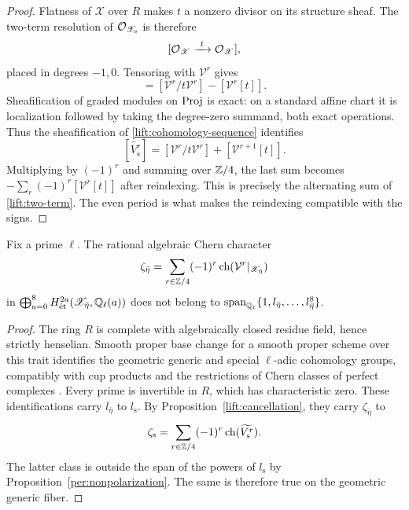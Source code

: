 \begin{proof}
Flatness of $\mathscr X$ over $R$ makes $t$ a nonzero divisor on its
structure sheaf.  The two-term resolution of
$\mathcal O_{\mathscr X_{\mathrm s}}$ is therefore
\[
 [\cO_{\mathscr X}\xrightarrow{\ t\ }\cO_{\mathscr X}],
\]
placed in degrees $-1,0$.  Tensoring with $\mathcal V^r$ gives
\begin{equation}
 [\mathbf L i_{\mathrm s}^*\mathcal V^r]
   =[\mathcal V^r/t\mathcal V^r]-[\mathcal V^r[t]].
 \label{lift:two-term}
\end{equation}
Sheafification of graded modules on $\operatorname{Proj}$ is exact: on a standard
affine chart it is localization followed by taking the degree-zero
summand, both exact operations.  Thus the sheafification of
\eqref{lift:cohomology-sequence} identifies
\[
 [\widetilde{V_{\mathrm s}^r}]
  =[\mathcal V^r/t\mathcal V^r]+[\mathcal V^{r+1}[t]].
\]
Multiplying by $(-1)^r$ and summing over $\mathbb Z/4$, the last sum becomes
$-\sum_r(-1)^r[\mathcal V^r[t]]$ after reindexing.  This is precisely
the alternating sum of \eqref{lift:two-term}.  The even period is what
makes the reindexing compatible with the signs.
\end{proof}

\begin{proposition}
\label{lift:generic-character}
Fix a prime $\ell$.  The rational algebraic Chern character
\[
 \zeta_{\bar\eta}
   =\sum_{r\in\mathbb Z/4}(-1)^r
        \operatorname{ch}(\mathcal V^r|_{\mathscr X_{\bar\eta}})
\]
in $\bigoplus_{a=0}^8H^{2a}_{\mathrm{\acute et}}
(\mathscr X_{\bar\eta},\mathbb Q_\ell(a))$ does not belong to
$\operatorname{span}_{\mathbb Q_\ell}\{1,l_{\bar\eta},\ldots,l_{\bar\eta}^8\}$.
\end{proposition}

\begin{proof}
The ring $R$ is complete with algebraically closed residue field, hence
strictly henselian.  Smooth proper base change for a smooth proper scheme
over this trait identifies the geometric generic and special
$\ell$-adic cohomology groups, compatibly with cup products and the
restrictions of Chern classes of perfect complexes
\cite{smooth-proper}.  Every prime is invertible in $R$, which has
characteristic zero.  These identifications carry $l_{\bar\eta}$ to
$l_{\mathrm s}$.  By Proposition~\ref{lift:cancellation}, they carry
$\zeta_{\bar\eta}$ to
\[
 \zeta_{\mathrm s}
   =\sum_{r\in\mathbb Z/4}(-1)^r\operatorname{ch}(\widetilde{V_{\mathrm s}^r}).
\]
The latter class is outside the span of the powers of $l_{\mathrm s}$
by Proposition~\ref{per:nonpolarization}.  The same is therefore true
on the geometric generic fiber.
\end{proof}

